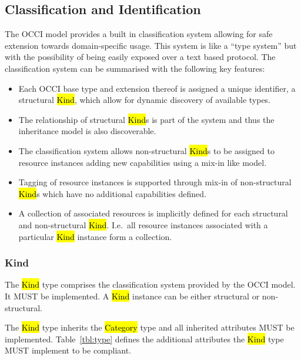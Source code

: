 \documentclass[10pt,a4paper,british]{article}
\begin{document}
\subsection{Classification and Identification}
\label{sec:classification}
The OCCI model provides a built in classification system allowing for safe
extension towards domain-specific usage. This system is like a ``type system''
but with the possibility of being easily exposed over a text based protocol.
%
The classification system can be summarised with the following key features:
\begin{itemize}
\item Each OCCI base type and extension thereof is assigned a unique
 identifier, a structural \hl{Kind}, which allow for dynamic discovery of available
 types.
\item The relationship of structural \hl{Kind}s is part of the system and thus
 the inheritance model is also discoverable.
\item The classification system allows non-structural \hl{Kind}s to be assigned
 to resource instances adding new capabilities using a mix-in like model.
\item Tagging of resource instances is supported through mix-in of
 non-structural \hl{Kind}s which have no additional capabilities defined.
\item A collection of associated resources is implicitly defined for each
 structural and non-structural \hl{Kind}. I.e.~all resource instances
 associated with a particular \hl{Kind} instance form a collection.
\end{itemize}

\subsubsection{Kind}
\label{sec:type}
The \hl{Kind} type comprises the classification system provided by the OCCI
model. It MUST be implemented. A \hl{Kind} instance can be either structural or
non-structural.

The \hl{Kind} type inherits the \hl{Category} type and all inherited
attributes MUST be implemented. Table~\ref{tbl:type} defines the
additional attributes the \hl{Kind} type MUST implement to be compliant.
\end{document}
